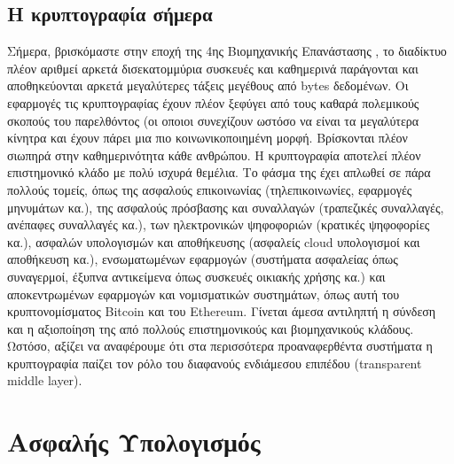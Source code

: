 \subsection{Η κρυπτογραφία σήμερα}
Σήμερα, βρισκόμαστε στην εποχή της 4ης Βιομηχανικής Επανάστασης \cite{drath2014industrie} \cite{skilton20184th}, το διαδίκτυο πλέον αριθμεί αρκετά δισεκατομμύρια συσκευές και καθημερινά παράγονται και αποθηκεύονται αρκετά μεγαλύτερες τάξεις μεγέθους από bytes δεδομένων. Οι εφαρμογές τις κρυπτογραφίας έχουν πλέον ξεφύγει από τους καθαρά πολεμικούς σκοπούς του παρελθόντος (οι οποιοι συνεχίζουν ωστόσο να είναι τα μεγαλύτερα κίνητρα και έχουν πάρει μια πιο κοινωνικοποιημένη μορφή. Βρίσκονται πλέον σιωπηρά στην καθημερινότητα κάθε ανθρώπου. Η κρυπτογραφία αποτελεί πλέον επιστημονικό κλάδο με πολύ ισχυρά θεμέλια. Το φάσμα της έχει απλωθεί σε πάρα πολλούς τομείς, όπως της ασφαλούς επικοινωνίας (τηλεπικοινωνίες, εφαρμογές μηνυμάτων κα.), της ασφαλούς πρόσβασης και συναλλαγών (τραπεζικές συναλλαγές, ανέπαφες συναλλαγές κα.), των ηλεκτρονικών ψηφοφοριών (κρατικές ψηφοφορίες κα.), ασφαλών υπολογισμών και αποθήκευσης (ασφαλείς cloud υπολογισμοί και αποθήκευση κα.), ενσωματωμένων εφαρμογών (συστήματα ασφαλείας όπως συναγερμοί, έξυπνα αντικείμενα όπως συσκευές οικιακής χρήσης κα.) και αποκεντρωμένων εφαρμογών και νομισματικών συστημάτων, όπως αυτή του κρυπτονομίσματος Bitcoin και του Ethereum. Γίνεται άμεσα αντιληπτή η σύνδεση και η αξιοποίηση της από πολλούς επιστημονικούς και βιομηχανικούς κλάδους. Ωστόσο, αξίζει να αναφέρουμε ότι στα περισσότερα προαναφερθέντα συστήματα η κρυπτογραφία παίζει τον ρόλο του διαφανούς ενδιάμεσου επιπέδου (transparent middle layer).

\section{Ασφαλής Υπολογισμός}


